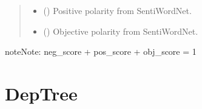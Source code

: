 \documentclass[letterpaper,10pt,english]{sphinxmanual}
\begin{document}
\begin{fulllineitems}
\begin{quote}
\begin{description}
\begin{itemize}
\item {} 
 () \textendash{} Positive polarity from SentiWordNet.

\item {} 
 () \textendash{} Objective polarity from SentiWordNet.

\end{itemize}

\end{description}\end{quote}

\begin{sphinxadmonition}{note}{Note:}
neg\_score + pos\_score + obj\_score = 1
\end{sphinxadmonition}

\end{fulllineitems}



\section{DepTree}
\label{\detokenize{classes:deptree}}
\end{document}
